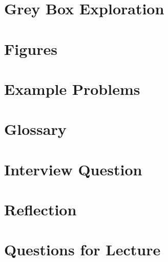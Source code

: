 \documentclass[12pt]{article}
\begin{document}
\section{Grey Box Exploration}

\section{Figures}

\section{Example Problems}

\section{Glossary}

\section{Interview Question}

\section{Reflection}

\section{Questions for Lecture}



\end{document}
